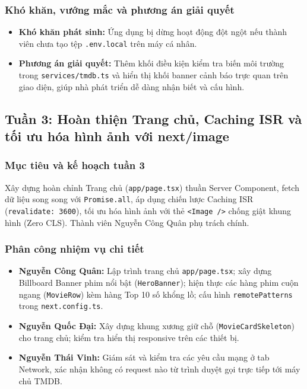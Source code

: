 \documentclass[13pt,a4paper]{extarticle}
\begin{document}
\subsubsection{Khó khăn, vướng mắc và phương án giải quyết}
\begin{itemize}[noitemsep]
    \item \textbf{Khó khăn phát sinh:} Ứng dụng bị dừng hoạt động đột ngột nếu thành viên chưa tạo tệp \texttt{.env.local} trên máy cá nhân.
    \item \textbf{Phương án giải quyết:} Thêm khối điều kiện kiểm tra biến môi trường trong \texttt{services/tmdb.ts} và hiển thị khối banner cảnh báo trực quan trên giao diện, giúp nhà phát triển dễ dàng nhận biết và cấu hình.
\end{itemize}

\subsection{Tuần 3: Hoàn thiện Trang chủ, Caching ISR và tối ưu hóa hình ảnh với next/image}

\subsubsection{Mục tiêu và kế hoạch tuần 3}
Xây dựng hoàn chỉnh Trang chủ (\texttt{app/page.tsx}) thuần Server Component, fetch dữ liệu song song với \texttt{Promise.all}, áp dụng chiến lược Caching ISR (\texttt{revalidate: 3600}), tối ưu hóa hình ảnh với thẻ \texttt{<Image />} chống giật khung hình (Zero CLS). Thành viên Nguyễn Công Quân phụ trách chính.

\subsubsection{Phân công nhiệm vụ chi tiết}
\begin{itemize}[noitemsep]
    \item \textbf{Nguyễn Công Quân:} Lập trình trang chủ \texttt{app/page.tsx}; xây dựng Billboard Banner phim nổi bật (\texttt{HeroBanner}); hiện thực các hàng phim cuộn ngang (\texttt{MovieRow}) kèm hàng Top 10 số khổng lồ; cấu hình \texttt{remotePatterns} trong \texttt{next.config.ts}.
    \item \textbf{Nguyễn Quốc Đại:} Xây dựng khung xương giữ chỗ (\texttt{MovieCardSkeleton}) cho trang chủ; kiểm tra hiển thị responsive trên các thiết bị.
    \item \textbf{Nguyễn Thái Vinh:} Giám sát và kiểm tra các yêu cầu mạng ở tab Network, xác nhận không có request nào từ trình duyệt gọi trực tiếp tới máy chủ TMDB.
\end{itemize}
\end{document}
